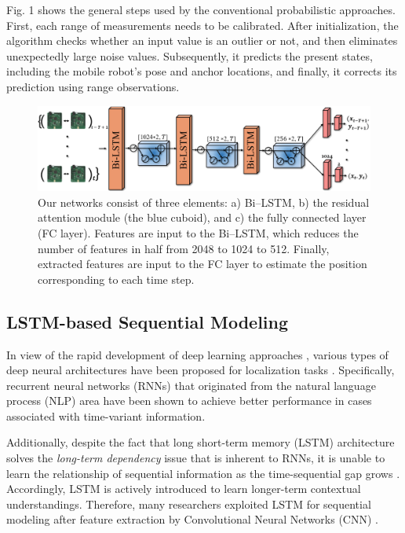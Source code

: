 \documentclass[letterpaper, 10 pt, conference]{ieeeconf}
\begin{document}
Fig. 1 shows the general steps used by the conventional probabilistic approaches. First, each range of measurements needs to be calibrated. After initialization, the algorithm checks whether an input value is an outlier or not, and then eliminates unexpectedly large noise values. Subsequently, it predicts the present states, including the mobile robot's pose and anchor locations, and finally, it corrects its prediction using range observations.

 \begin{figure}[h]
	\centering
	\includegraphics[width=0.95\linewidth]{image/network_figure}
	\caption{Our networks consist of three elements: a) Bi--LSTM, b) the residual attention module (the blue cuboid), and c) the fully connected layer (FC layer). Features are input to the Bi--LSTM, which reduces the number of features in half from 2048 to 1024 to 512. Finally, extracted features are input to the FC layer to estimate the position corresponding to each time step.}
	\label{fig:our_network} 	
\end{figure}

\subsection{LSTM-based Sequential Modeling}

In view of the rapid development of deep learning approaches \cite{lecun2015deep}, various types of deep neural architectures have been proposed for localization tasks \cite{kendall2016modelling, kendall2015posenet, gladh2016deep}. Specifically, recurrent neural networks (RNNs) that originated from the natural language process (NLP) area \cite{elman1990finding} have been shown to achieve better performance in cases associated with time-variant information. 

Additionally, despite the fact that long short-term memory (LSTM) architecture solves the \textit{long-term dependency} issue that is inherent to RNNs, it is unable to learn the relationship of sequential information as the time-sequential gap grows \cite{hochreiter1997long}. Accordingly, LSTM is actively introduced to learn longer-term contextual understandings. Therefore, many researchers exploited LSTM for sequential modeling after feature extraction by Convolutional Neural Networks (CNN) \cite{clark2017vinet,patel2018contextualnet, wang2017deepvo}. 
\end{document}
